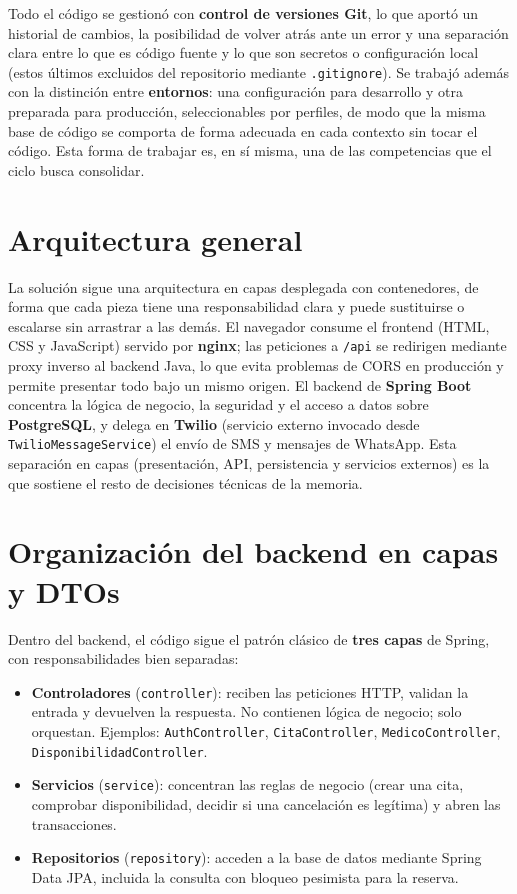 \documentclass[12pt,a4paper]{report}
\begin{document}
Todo el código se gestionó con \textbf{control de versiones Git}, lo que aportó un historial de cambios, la posibilidad de volver atrás ante un error y una separación clara entre lo que es código fuente y lo que son secretos o configuración local (estos últimos excluidos del repositorio mediante \texttt{.gitignore}). Se trabajó además con la distinción entre \textbf{entornos}: una configuración para desarrollo y otra preparada para producción, seleccionables por perfiles, de modo que la misma base de código se comporta de forma adecuada en cada contexto sin tocar el código. Esta forma de trabajar es, en sí misma, una de las competencias que el ciclo busca consolidar.

\section{Arquitectura general}

La solución sigue una arquitectura en capas desplegada con contenedores, de forma que cada pieza tiene una responsabilidad clara y puede sustituirse o escalarse sin arrastrar a las demás. El navegador consume el frontend (HTML, CSS y JavaScript) servido por \textbf{nginx}; las peticiones a \texttt{/api} se redirigen mediante proxy inverso al backend Java, lo que evita problemas de CORS en producción y permite presentar todo bajo un mismo origen. El backend de \textbf{Spring Boot} concentra la lógica de negocio, la seguridad y el acceso a datos sobre \textbf{PostgreSQL}, y delega en \textbf{Twilio} (servicio externo invocado desde \texttt{TwilioMessageService}) el envío de SMS y mensajes de WhatsApp. Esta separación en capas (presentación, API, persistencia y servicios externos) es la que sostiene el resto de decisiones técnicas de la memoria.



\section{Organización del backend en capas y DTOs}

Dentro del backend, el código sigue el patrón clásico de \textbf{tres capas} de Spring, con responsabilidades bien separadas:

\begin{itemize}
  \item \textbf{Controladores} (\texttt{controller}): reciben las peticiones HTTP, validan la entrada y devuelven la respuesta. No contienen lógica de negocio; solo orquestan. Ejemplos: \texttt{AuthController}, \texttt{CitaController}, \texttt{MedicoController}, \texttt{DisponibilidadController}.
  \item \textbf{Servicios} (\texttt{service}): concentran las reglas de negocio (crear una cita, comprobar disponibilidad, decidir si una cancelación es legítima) y abren las transacciones.
  \item \textbf{Repositorios} (\texttt{repository}): acceden a la base de datos mediante Spring Data JPA, incluida la consulta con bloqueo pesimista para la reserva.
\end{itemize}
\end{document}

